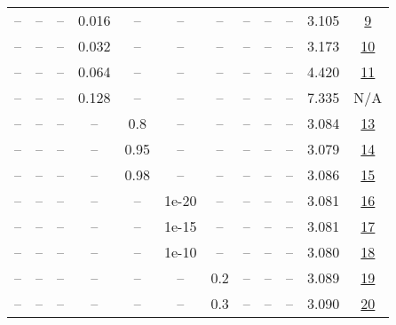 \begin{table}[H]
\begin{tabular}{cccccccccccc}
-- & -- & -- & 0.016 & -- & -- & -- & -- & -- & -- & 3.105 & \href{https://wandb.ai/stanford-mercury/optimizer-scaling/runs/sweep-520m-10B-scionb6a4a1lr0.016-wd0.1-minlr0-warmup0-b10.98-gn-db98af}{9} \\
-- & -- & -- & 0.032 & -- & -- & -- & -- & -- & -- & 3.173 & \href{https://wandb.ai/stanford-mercury/optimizer-scaling/runs/sweep-520m-10B-scion338c4elr0.032-wd0.1-minlr0-warmup0-b10.98-gn-1dc138}{10} \\
-- & -- & -- & 0.064 & -- & -- & -- & -- & -- & -- & 4.420 & \href{https://wandb.ai/stanford-mercury/optimizer-scaling/runs/sweep-520m-10B-scion901078lr0.064-wd0.1-minlr0-warmup0-b10.98-gn-a88498}{11} \\
-- & -- & -- & 0.128 & -- & -- & -- & -- & -- & -- & 7.335 & N/A \\
-- & -- & -- & -- & 0.8 & -- & -- & -- & -- & -- & 3.084 & \href{https://wandb.ai/stanford-mercury/optimizer-scaling/runs/sweep-520m-10B-scion63f66flr0.008-wd0.1-minlr0-warmup0-b10.98-gn-21681b}{13} \\
-- & -- & -- & -- & 0.95 & -- & -- & -- & -- & -- & 3.079 & \href{https://wandb.ai/stanford-mercury/optimizer-scaling/runs/sweep-520m-10B-scionc12795lr0.008-wd0.1-minlr0-warmup0-b10.98-gn-ec659b}{14} \\
-- & -- & -- & -- & 0.98 & -- & -- & -- & -- & -- & 3.086 & \href{https://wandb.ai/stanford-mercury/optimizer-scaling/runs/sweep-520m-10B-scion501dfalr0.008-wd0.1-minlr0-warmup0-b10.98-gn-a9913d}{15} \\
-- & -- & -- & -- & -- & 1e-20 & -- & -- & -- & -- & 3.081 & \href{https://wandb.ai/stanford-mercury/optimizer-scaling/runs/sweep-520m-10B-scion2bd3fdlr0.008-wd0.1-minlr0-warmup0-b10.98-gn-03fce1}{16} \\
-- & -- & -- & -- & -- & 1e-15 & -- & -- & -- & -- & 3.081 & \href{https://wandb.ai/stanford-mercury/optimizer-scaling/runs/sweep-520m-10B-scion9d476clr0.008-wd0.1-minlr0-warmup0-b10.98-gn-8744c9}{17} \\
-- & -- & -- & -- & -- & 1e-10 & -- & -- & -- & -- & 3.080 & \href{https://wandb.ai/stanford-mercury/optimizer-scaling/runs/sweep-520m-10B-scion890acblr0.008-wd0.1-minlr0-warmup0-b10.98-gn-f305ce}{18} \\
-- & -- & -- & -- & -- & -- & 0.2 & -- & -- & -- & 3.089 & \href{https://wandb.ai/stanford-mercury/optimizer-scaling/runs/sweep-520m-10B-sciona0c000lr0.008-wd0.1-minlr0-warmup0-b10.98-gn-d5b09d}{19} \\
-- & -- & -- & -- & -- & -- & 0.3 & -- & -- & -- & 3.090 & \href{https://wandb.ai/stanford-mercury/optimizer-scaling/runs/sweep-520m-10B-sciondcb087lr0.008-wd0.1-minlr0-warmup0-b10.98-gn-292cdc}{20} \\

\end{tabular}
\end{table}

